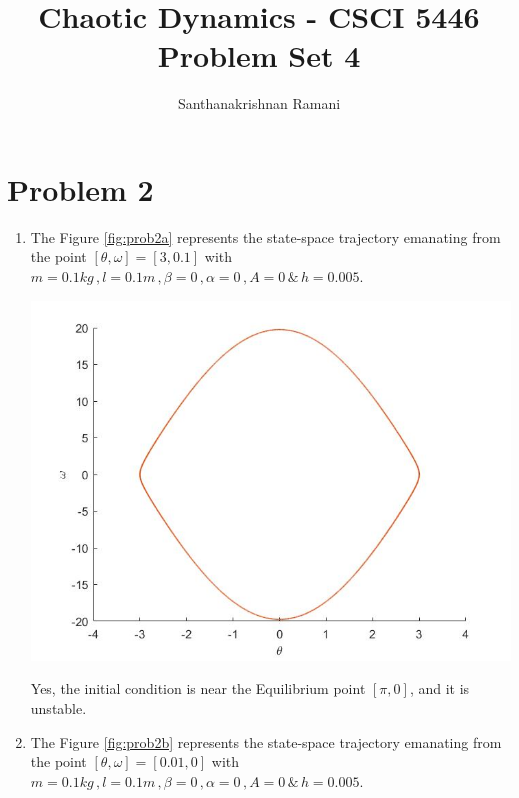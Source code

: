 \documentclass{article}
\date{\displaydate{date}}
\title{\textbf{Chaotic Dynamics - CSCI 5446} \\
Problem Set 4}
\author{Santhanakrishnan Ramani}
\begin{document}
\maketitle

\section*{Problem 2}
\begin{enumerate}[label=(\alph*)]

\item 
The Figure \ref{fig:prob2a} represents the state-space trajectory emanating from the point $[\theta,\omega] = [3,0.1]$ with \\$m = 0.1kg\,, l = 0.1m\,, \beta = 0\,, \alpha = 0\,, A =0 \,\&\, h = 0.005.$ \par\bigskip
\begin{minipage}{\linewidth}
{
\centering 
\includegraphics[scale=0.35]{images/prob2a.jpg}
\label{fig:prob2a}
}
\par\medskip
Yes, the initial condition is near the Equilibrium point $[\pi,0]$, and it is unstable.
\end{minipage}
\item
The Figure \ref{fig:prob2b} represents the state-space trajectory emanating from the point $[\theta,\omega] = [0.01,0]$ with \\$m = 0.1kg\,, l = 0.1m\,, \beta = 0\,, \alpha = 0\,, A =0 \,\&\, h = 0.005.$ \par\bigskip
\begin{minipage}{\linewidth}
{
\centering 
}
\end{minipage}
\end{enumerate}
\end{document}
